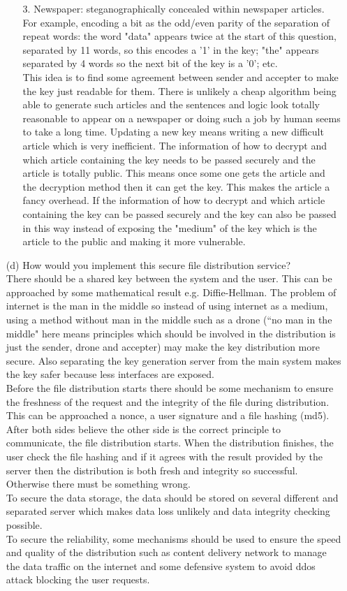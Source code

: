 \documentclass[10pt,twoside,a4paper]{article}
\begin{document}
\begin{itemize}
\begin{itemize}
\item[3.] Newspaper: steganographically concealed within newspaper articles. For example, encoding a bit as the odd/even parity of the separation of repeat words: the word "data" appears twice at the start of this question, separated by 11 words, so this encodes a '1' in the key; "the" appears separated by 4 words so the next bit of the key is a '0'; etc.\\
This idea is to find some agreement between sender and accepter to make the key just readable for them. There is unlikely a cheap algorithm being able to generate such articles and the sentences and logic look totally reasonable to appear on a newspaper or doing such a job by human seems to take a long time. Updating a new key means writing a new difficult article which is very inefficient. The information of how to decrypt and which article containing the key needs to be passed securely and the article is totally public. This means once some one gets the article and the decryption method then it can get the key. This makes the article a fancy overhead. If the information of how to decrypt and which article containing the key can be passed securely and the key can also be passed in this way instead of exposing the "medium" of the key which is the article to the public and making it more vulnerable.
\end{itemize}
\item[(d)] How would you implement this secure file distribution service?\\
There should be a shared key between the system and the user. This can be approached by some mathematical result e.g. Diffie-Hellman. The problem of internet is the man in the middle so instead of using internet as a medium, using a method without man in the middle such as a drone (``no man in the middle" here means principles which should be involved in the distribution is just the sender, drone and accepter) may make the key distribution more secure. Also separating the key generation server from the main system makes the key safer because less interfaces are exposed.
\\Before the file distribution starts there should be some mechanism to ensure the freshness of the request and the integrity of the file during distribution. This can be approached a nonce, a user signature and a file hashing (md5). After both sides believe the other side is the correct principle to communicate, the file distribution starts. When the distribution finishes, the user check the file hashing and if it agrees with the result provided by the server then the distribution is both fresh and integrity so successful. Otherwise there must be something wrong.
\\To secure the data storage, the data should be stored on several different and separated server which makes data loss unlikely and data integrity checking possible.
\\To secure the reliability, some mechanisms should be used to ensure the speed and quality of the distribution such as content delivery network to manage the data traffic on the internet and some defensive system to avoid ddos attack blocking the user requests.

\end{itemize}
\end{document}
